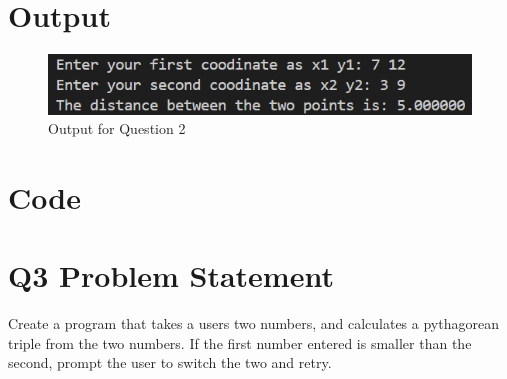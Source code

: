 \documentclass{article}
\begin{document}
\begin{flushleft}
	\section{Output}
	\begin{figure}[!h]
		\begin{centering}
			\includegraphics[width=\linewidth]{Q2Output.png}
			\caption{Output for Question 2}
		\end{centering}
	\end{figure}
	\section{Code}
	
	\newpage
	\section{Q3 Problem Statement}
	Create a program that takes a users two numbers, and calculates a pythagorean triple from the two numbers. If the first number entered is smaller than the second, prompt the user to switch the two and retry.

\end{flushleft}
\end{document}
